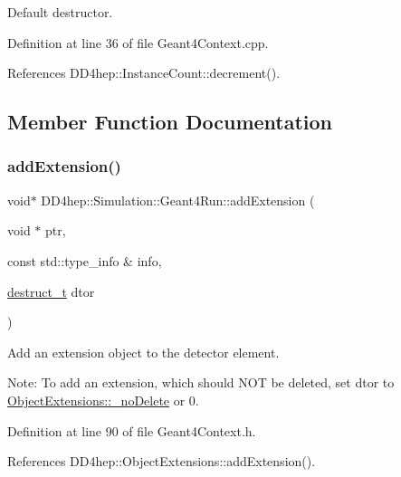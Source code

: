 Default destructor. 



Definition at line 36 of file Geant4\+Context.\+cpp.



References D\+D4hep\+::\+Instance\+Count\+::decrement().



\subsection{Member Function Documentation}
\hypertarget{class_d_d4hep_1_1_simulation_1_1_geant4_run_aa825451bec9637a51d98d46e23334b75}{}\label{class_d_d4hep_1_1_simulation_1_1_geant4_run_aa825451bec9637a51d98d46e23334b75} 
\subsubsection{\texorpdfstring{add\+Extension()}{addExtension()}\hspace{0.1cm}{\footnotesize\ttfamily [1/2]}}
{\footnotesize\ttfamily void$\ast$ D\+D4hep\+::\+Simulation\+::\+Geant4\+Run\+::add\+Extension (\begin{DoxyParamCaption}\item[{void $\ast$}]{ptr,  }\item[{const std\+::type\+\_\+info \&}]{info,  }\item[{\hyperlink{class_d_d4hep_1_1_object_extensions_a705a3524f9097577069a83993a39a9b2}{destruct\+\_\+t}}]{dtor }\end{DoxyParamCaption})\hspace{0.3cm}{\ttfamily [inline]}}



Add an extension object to the detector element. 

Note\+: To add an extension, which should N\+OT be deleted, set \textquotesingle{}dtor\textquotesingle{} to \hyperlink{class_d_d4hep_1_1_object_extensions_a0c32fb2af89407102b494ab9c15f9eac}{Object\+Extensions\+::\+\_\+no\+Delete} or 0. 

Definition at line 90 of file Geant4\+Context.\+h.



References D\+D4hep\+::\+Object\+Extensions\+::add\+Extension().

